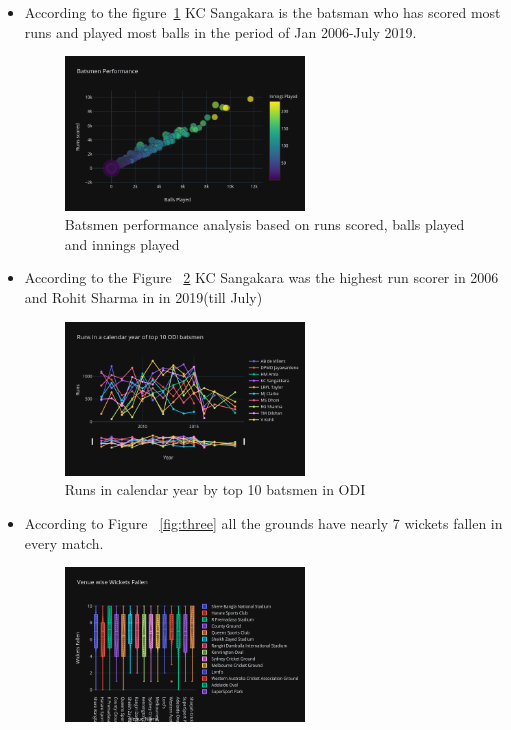 \documentclass[fleqn,10pt]{wlscirep}
\begin{document}
\begin{itemize}
    \item According to the figure~\ref{fig:one} KC Sangakara is the batsman who has scored most runs and played most balls in the period of Jan 2006-July 2019.
    \begin{figure}[!htb]
        \centering
        \includegraphics[width=0.6\textwidth]{bats.png}
        \caption{Batsmen performance analysis based on runs scored, balls played and innings played}
        \label{fig:one}
      \end{figure}
      \item According to the Figure ~\ref{fig:two} KC Sangakara was the highest run scorer in 2006 and Rohit Sharma in in 2019(till July)
      \begin{figure}[!htb]
        \centering
        \includegraphics[width=0.6\textwidth]{batsmen.png}
        \caption{Runs in calendar year by top 10 batsmen in ODI}
        \label{fig:two}
      \end{figure}
      \item According to Figure ~\ref{fig:three} all the grounds have nearly 7 wickets fallen in every match.
      \begin{figure}[!htb]
        \centering
        \includegraphics[width=0.6\textwidth]{wicvenue.png}

\end{figure}
\end{itemize}
\end{document}
